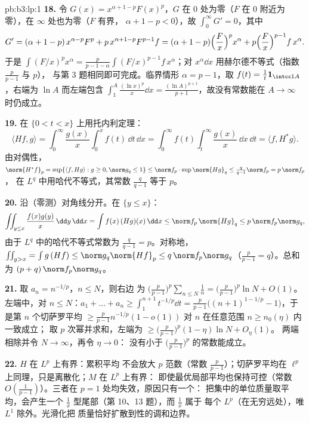 \begin{solution}{pb:b3:lp:1}
\textbf{18.} 令 $G(x) = x^{\alpha+1-p}F(x)^p$，$G$ 在
$0$ 处为零（$F$ 在 $0$ 附近为零），在 $\infty$ 处也为零（$F$ 有界，
$\alpha + 1 - p < 0$），故 $\int_0^\infty G' = 0$，其中
\[
G' = (\alpha + 1 - p)\,x^{\alpha-p}F^p +
p\,x^{\alpha+1-p}F^{p-1}f
= (\alpha + 1 - p)\Bigl(\frac Fx\Bigr)^px^\alpha +
p\Bigl(\frac Fx\Bigr)^{p-1}f\,x^\alpha .
\]
于是 $\int(F/x)^px^\alpha = \frac{p}{p-1-\alpha}
\int(F/x)^{p-1}f\,x^\alpha$；对
$x^\alpha\dd x$ 用赫尔德不等式（指数 $\frac p{p-1}$ 与 $p$），
与第 3 题相同即可完成。临界情形 $\alpha = p - 1$，取 $f(t) =
\frac1t\mathbf 1_{\intcc1A}$，右端为 $\ln A$
而左端包含 $\int_1^A\frac{(\ln x)^p}x\dd x =
\frac{(\ln A)^{p+1}}{p+1}$，故没有常数能在 $A \to
\infty$ 时仍成立。

\textbf{19.} 在 $\{0 < t < x\}$ 上用托内利定理：
\[
\langle Hf, g\rangle =
\int_0^\infty\frac{g(x)}x\int_0^xf(t)\,\dd t\,\dd x
= \int_0^\infty f(t)\int_t^\infty\frac{g(x)}x\,\dd x\,\dd t
= \langle f, H^*g\rangle .
\]
由对偶性，$\norm{H^*f}_p = \sup\{\langle f, Hg\rangle : g
\geq 0, \norm g_q \leq 1\} \leq \norm f_p\cdot
\sup\norm{Hg}_q \leq \frac q{q-1}\norm f_p = p\,\norm f_p$，
在 $L^q$ 中用哈代不等式，其常数 $\frac q{q-1}$
等于 $p$。

\textbf{20.} 沿（零测）对角线分开。在 $\{y \leq
x\}$：
\[
\iint_{y\leq x}\frac{f(x)g(y)}{x}\,\dd y\,\dd x
= \int f(x)\,(Hg)(x)\,\dd x \leq \norm f_p\,\norm{Hg}_q
\leq p\,\norm f_p\norm g_q,
\]
由于 $L^q$ 中的哈代不等式常数为 $\frac q{q-1} =
p$。对称地，$\iint_{y>x} = \int g\,(Hf) \leq
\norm g_q\norm{Hf}_p \leq q\,\norm f_p\norm g_q$（$\frac
p{p-1} = q$）。总和为 $(p + q)\,\norm f_p\norm g_q$。

\textbf{21.} 取 $a_n = n^{-1/p}$，$n \leq N$，则右边
为 $\bigl(\frac p{p-1}\bigr)^p\sum_{n\leq N}\frac1n =
\bigl(\frac p{p-1}\bigr)^p\ln N + O(1)$。左端中，对 $n
\leq N$：$a_1 + \dots + a_n \geq \int_1^{n+1}t^{-1/p}\dd t =
\frac{p}{p-1}\bigl((n+1)^{1-1/p} - 1\bigr)$，于是第 $n$
个切萨罗平均 $\geq \frac p{p-1}n^{-1/p}(1 -
o(1))$ 对 $n$ 在任意范围 $n \geq n_0(\eta)$ 内一致成立；
取 $p$ 次幂并求和，左端为 $\geq
\bigl(\frac p{p-1}\bigr)^p(1 - \eta)\ln N + O_\eta(1)$。
两端相除并令 $N \to \infty$，再令 $\eta \to 0$：
没有小于 $\bigl(\frac p{p-1}\bigr)^p$ 的常数能成立。

\textbf{22.} $H$ 在 $L^p$ 上有界：累积平均
不会放大 $p$ 范数（常数 $\frac p{p-1}$）；切萨罗平均在
$\ell^p$ 上同理，只是离散化；$M$ 在 $L^p$ 上有界：
即使最优局部平均也保持可控（常数
$O(\frac1{p-1})$）。三者在 $p = 1$ 处均失效，原因只有一个：
把集中的单位质量取平均，会产生一个
$\frac1x$ 型尾部（第 10、13 题），而 $\frac1x$ 属于
每个 $L^p$（在无穷远处），唯 $L^1$ 除外。光滑化把
质量恰好扩散到性的调和边界。


\end{solution}

